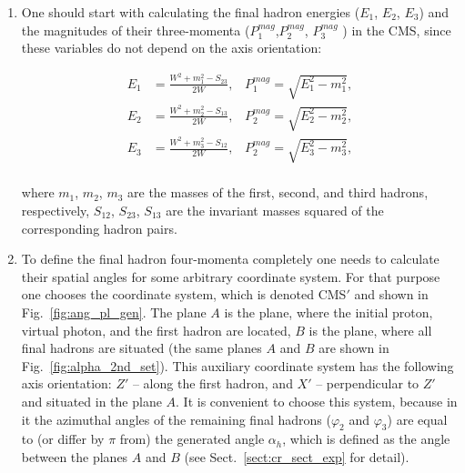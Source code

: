 \begin{enumerate}

\item One should start with calculating the final hadron energies ($E_{1}$, $E_{2}$, $E_{3}$) and the magnitudes of their three-momenta ($P_{1}^{mag}$,$P_{2}^{mag}$, $P_{3}^{mag}$ ) in the CMS, since these variables do not depend on the axis orientation:

\begin{equation}
\begin{split}
E_{1} &= \frac{W^{2}+m_{1}^{2}-S_{23}}{2W},\;\;\;  P_{1}^{mag} = \sqrt{E_{1}^{2}-m_{1}^{2}},\\
E_{2} &= \frac{W^{2}+m_{2}^{2}-S_{13}}{2W},\;\;\;  P_{2}^{mag} = \sqrt{E_{2}^{2}-m_{2}^{2}},\\
E_{3} &= \frac{W^{2}+m_{3}^{2}-S_{12}}{2W},\;\;\;  P_{2}^{mag} = \sqrt{E_{3}^{2}-m_{3}^{2}},\\
\end{split}\label{eq:cms_prime_en_mom_mag}
\end{equation}

where $m_{1}$, $m_{2}$, $m_{3}$ are the masses of the first, second, and third hadrons, respectively, $S_{12}$, $S_{23}$, $S_{13}$ are the invariant masses squared of the corresponding hadron pairs.

\item To define the final hadron four-momenta completely one needs to calculate their spatial angles for some arbitrary coordinate system. For that purpose one chooses the coordinate system, which is denoted CMS$'$ and shown in Fig.~\ref{fig:ang_pl_gen}. The plane $A$ is the plane, where the initial proton, virtual photon, and the first hadron are located, $B$ is the plane, where all final hadrons are situated (the same planes $A$ and $B$ are shown in Fig.~\ref{fig:alpha_2nd_set}). This auxiliary coordinate system has the following axis orientation: $Z'$ -- along the first hadron, and $X'$ -- perpendicular to $Z'$ and situated in the plane $A$. It is convenient to choose this system, because in it the azimuthal angles of the remaining final hadrons ($\varphi_{2}$ and $\varphi_{3}$) are equal to (or differ by $\pi$ from) the generated angle $\alpha_{h}$, which is defined as the angle between the planes $A$ and $B$ (see Sect.~\ref{sect:cr_sect_exp} for detail).

  




\end{enumerate}
